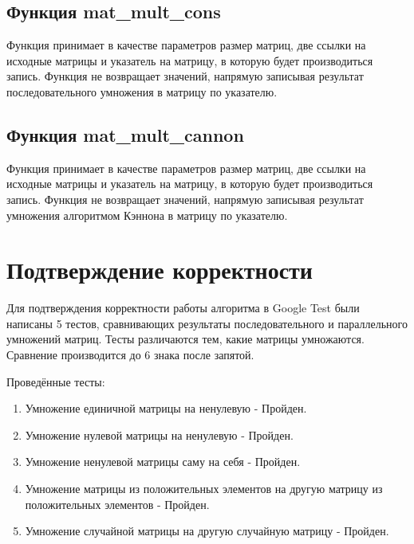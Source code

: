 \documentclass{report}
\begin{document}
\subsection*{Функция mat\_mult\_cons}
\par Функция принимает в качестве параметров размер матриц, две ссылки на исходные матрицы и указатель на матрицу, в которую будет производиться запись. Функция не возвращает значений, напрямую записывая результат последовательного умножения в матрицу по указателю.
\subsection*{Функция mat\_mult\_cannon}
\par Функция принимает в качестве параметров размер матриц, две ссылки на исходные матрицы и указатель на матрицу, в которую будет производиться запись. Функция не возвращает значений, напрямую записывая результат умножения алгоритмом Кэннона в матрицу по указателю.
\newpage

\section*{Подтверждение корректности}
\par Для подтверждения корректности работы алгоритма в Google Test были написаны 5 тестов, сравнивающих результаты последовательного и параллельного умножений матриц. Тесты различаются тем, какие матрицы умножаются. Сравнение производится до 6 знака после запятой.
\par Проведённые тесты:
\begin{enumerate}
    \item Умножение единичной матрицы на ненулевую - Пройден.
    \item Умножение нулевой матрицы на ненулевую - Пройден.
    \item Умножение ненулевой матрицы саму на себя - Пройден.
    \item Умножение матрицы из положительных элементов на другую матрицу из положительных элементов - Пройден.
    \item Умножение случайной матрицы на другую случайную матрицу - Пройден.
\end{enumerate}
\newpage
\end{document}
